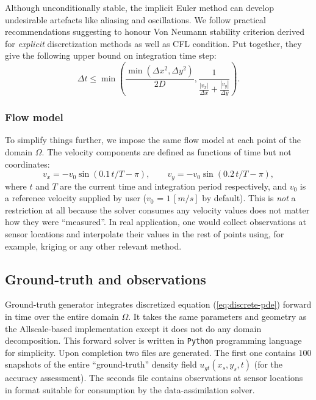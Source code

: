 \documentclass[acmsmall,review,anonymous]{acmart}\settopmatter{printfolios=true,printccs=false,printacmref=false}
\begin{document}
Although unconditionally stable, the implicit Euler method can develop undesirable artefacts like aliasing and oscillations. We follow practical recommendations suggesting to honour Von Neumann stability criterion derived for \textit{explicit} discretization methods as well as CFL condition. Put together, they give the following upper bound on integration time step:
\begin{equation}
\Delta{t} \le \min\left(
\frac{\min\left(\Delta{x}^2, \Delta{y}^2\right)}{2 D},
\frac{1}{\frac{|v_x|}{\Delta{x}} + \frac{|v_y|}{\Delta{y}}}
\right).
\label{eq:time-step}
\end{equation}

\subsubsection{Flow model}
To simplify things further, we impose the same flow model at each point of the domain $\Omega$. The velocity components are defined as functions of time but not coordinates:
\begin{equation}
v_x = -v_0 \sin{(0.1 \, t / T - \pi)}, \qquad
v_y = -v_0 \sin{(0.2 \, t / T - \pi)},
\label{eq:flow}
\end{equation}
where $t$ and $T$ are the current time and integration period respectively, and $v_0$ is a reference velocity supplied by user ($v_0$ = $1\,[m/s]$ by default). This is \textit{not} a restriction at all because the solver consumes any velocity values does not matter how they were ``measured''. In real application, one would collect observations at sensor locations and interpolate their values in the rest of points using, for example, kriging or any other relevant method.

\subsection{Ground-truth and observations}

Ground-truth generator integrates discretized equation (\ref{eq:discrete-pde}) forward in time over the entire domain $\Omega$. It takes the same parameters and geometry as the Allscale-based implementation except it does not do any domain decomposition. This forward solver is written in \texttt{Python} programming language for simplicity. Upon completion two files are generated. The first one contains $100$ snapshots of the entire ``ground-truth'' density field $u_{gt}(x_s,y_s,t)$ (for the accuracy assessment). The seconds file contains observations at sensor locations in format suitable for consumption by the data-assimilation solver. 
\end{document}
